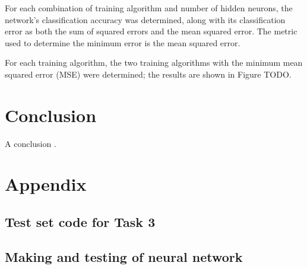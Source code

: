 \documentclass[a4paper, 10pt, conference]{ieeeconf}
\begin{document}
For each combination of training algorithm and number of hidden neurons, the network's classification accuracy was determined, along with its classification error as both the sum of squared errors and the mean squared error. The metric used to determine the minimum error is the mean squared error.

For each training algorithm, the two training algorithms with the minimum mean squared error (MSE) were determined; the results are shown in Figure TODO.




\section{Conclusion}

A conclusion \cite{pca}. 




\onecolumn
\section{Appendix} \label{sec:appendix}

\subsection*{Test set code for Task 3}

\newpage

\subsection*{Making and testing of neural network}

\newpage
\end{document}
